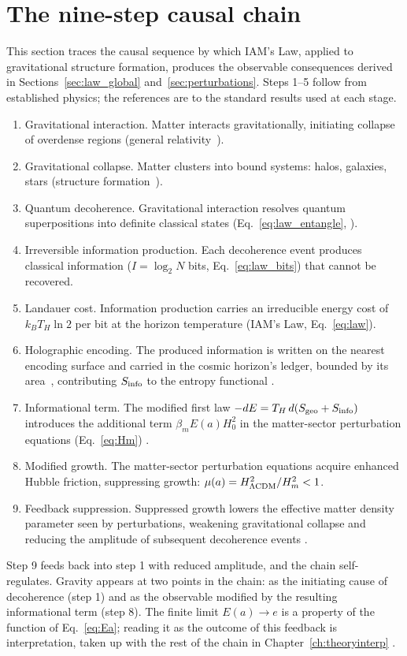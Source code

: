 \section{The nine-step causal chain}
This section traces the causal sequence by which IAM's Law, applied to gravitational structure formation, produces the observable consequences derived in
Sections~\ref{sec:law_global} and~\ref{sec:perturbations}. Steps 1--5 follow from established physics; the references are to the standard results used at
each stage.
\begin{enumerate}
\item Gravitational interaction. Matter interacts gravitationally, initiating collapse of overdense regions (general relativity~\cite{Einstein1915}).
\item Gravitational collapse. Matter clusters into bound systems: halos, galaxies, stars (structure formation~\cite{PressSchechter1974}).
\item Quantum decoherence. Gravitational interaction resolves quantum superpositions into definite classical states (Eq.~\eqref{eq:law_entangle},
\cite{Zurek2003}).
\item Irreversible information production. Each decoherence event produces classical information ($I=\log_2N$ bits, Eq.~\eqref{eq:law_bits}) that cannot be
recovered.
\item Landauer cost. Information production carries an irreducible energy cost of $k_BT_H\ln2$ per bit at the horizon temperature (IAM's Law,
Eq.~\eqref{eq:law}).
\item Holographic encoding. The produced information is written on the nearest encoding surface and carried in the cosmic horizon's ledger, bounded by its area~\cite{Bekenstein1973,tHooft1993,Susskind1995},
contributing $S_{\rm info}$ to the entropy functional \conjecture.
\item Informational term. The modified first law $-dE=T_H\,d(S_{\rm geo}+S_{\rm info})$ introduces the additional term $\beta_mE(a)H_0^2$ in the matter-sector
perturbation equations (Eq.~\eqref{eq:Hm}) \conjecture.
\item Modified growth. The matter-sector perturbation equations acquire enhanced Hubble friction, suppressing growth: $\mu(a)=H^2_{\Lambda{\rm CDM}}/H_m^2<1$.
\item Feedback suppression. Suppressed growth lowers the effective matter density parameter seen by perturbations, weakening gravitational collapse and
reducing the amplitude of subsequent decoherence events \conjecture.
\end{enumerate}
Step 9 feeds back into step 1 with reduced amplitude, and the chain self-regulates. Gravity appears at two points in the chain: as the initiating cause of
decoherence (step 1) and as the observable modified by the resulting informational term (step 8). The finite limit $E(a)\to e$ is a property of the
function of Eq.~\eqref{eq:Ea}; reading it as the outcome of this feedback is interpretation, taken up with the rest of the chain in
Chapter~\ref{ch:theoryinterp} \interp.


